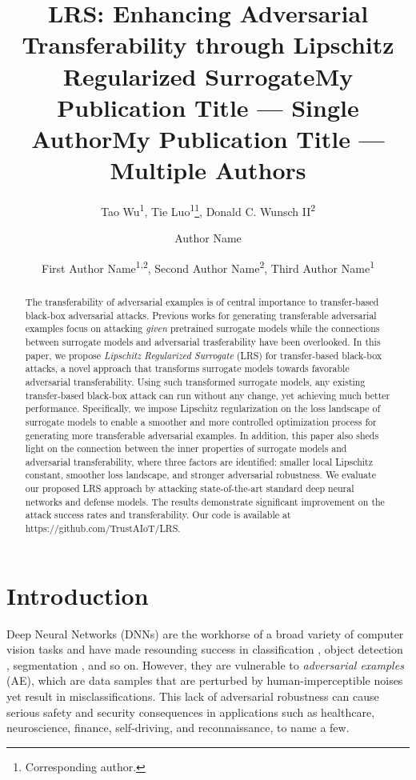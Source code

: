\documentclass[letterpaper]{article} %
\title{LRS: Enhancing Adversarial Transferability through Lipschitz Regularized Surrogate}
\author{
    Tao Wu\textsuperscript{\rm 1},
    Tie Luo\textsuperscript{\rm 1}\thanks{Corresponding author.},
    Donald C. Wunsch II\textsuperscript{\rm 2}
}
\title{My Publication Title --- Single Author}
\author {
    Author Name
}
\title{My Publication Title --- Multiple Authors}
\author {
    First Author Name\textsuperscript{\rm 1,\rm 2},
    Second Author Name\textsuperscript{\rm 2},
    Third Author Name\textsuperscript{\rm 1}
}
\theoremstyle{plain}
\theoremstyle{definition}
\begin{document}
\maketitle

\begin{abstract}
The transferability of adversarial examples is of central importance to transfer-based black-box adversarial attacks. Previous works for generating transferable adversarial examples focus on attacking \emph{given} pretrained surrogate models while the connections between surrogate models and adversarial trasferability have been overlooked. In this paper, we propose {\em Lipschitz Regularized Surrogate} (LRS) for transfer-based black-box attacks, a novel approach that transforms surrogate models towards favorable adversarial transferability. Using such transformed surrogate models, any existing transfer-based black-box attack can run without any change, yet achieving much better performance. Specifically, we impose Lipschitz regularization on the loss landscape of surrogate models to enable a smoother and more controlled optimization process for generating more transferable adversarial examples. In addition, this paper also sheds light on the connection between the inner properties of surrogate models and adversarial transferability, where three factors are identified: smaller local Lipschitz constant, smoother loss landscape, and stronger adversarial robustness. We evaluate our proposed LRS approach by attacking state-of-the-art standard deep neural networks and defense models. The results demonstrate significant improvement on the attack success rates and transferability. Our code is available at https://github.com/TrustAIoT/LRS.
\end{abstract}

\section{Introduction}

Deep Neural Networks (DNNs) are the workhorse of a broad variety of computer vision tasks and have made resounding success in classification \cite{he2016resnet}, object detection \cite{redmon2016you}, segmentation \cite{ronneberger2015u}, and so on. However, they are vulnerable to \emph{adversarial examples} (AE), which are data samples that are perturbed by human-imperceptible noises yet result in misclassifications. This lack of adversarial robustness can cause serious safety and security consequences in applications such as healthcare, neuroscience, finance, self-driving, and reconnaissance, to name a few.
\end{document}
